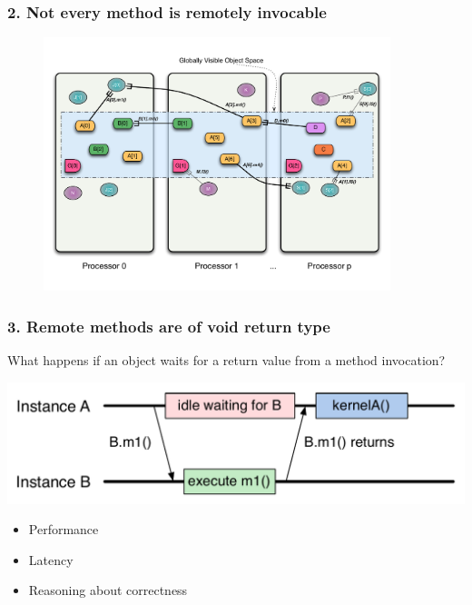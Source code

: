 \begin{frame}
\frametitle{2. Not every method is remotely invocable}
  \begin{figure}\includegraphics[width=0.9\textwidth]{../figures/progmodel/11-global-methods.pdf}\end{figure}
\end{frame}


\begin{frame}
\frametitle{3. Remote methods are of void return type}
  What happens if an object waits for a return value from a method invocation?
  \pause
  \begin{center}
    \includegraphics[width=\textwidth]{../figures/objectSequence.pdf}
  \end{center}
  \pause
  \begin{itemize}
    \item Performance
    \item Latency
    \item Reasoning about correctness
  \end{itemize}
\end{frame}



